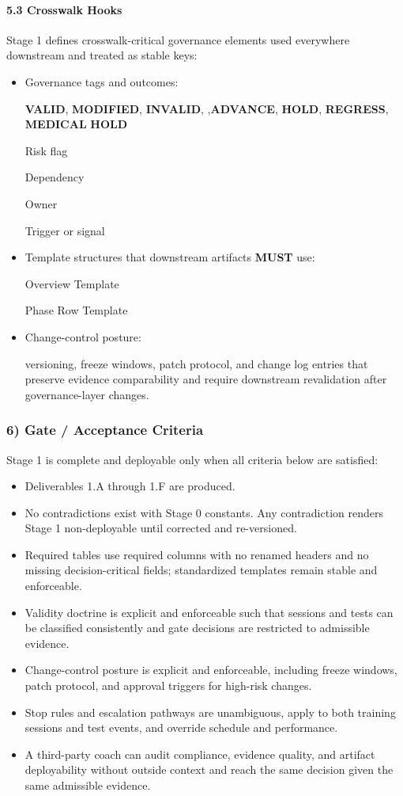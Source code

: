\documentclass[10pt]{article}
\begin{document}
\paragraph*{5.3 Crosswalk Hooks}

Stage 1 defines crosswalk-critical governance elements used everywhere downstream and treated as stable keys:

\begin{itemize}
\item Governance tags and outcomes:

\textbf{VALID}, \textbf{MODIFIED}, \textbf{INVALID}, ,\textbf{ADVANCE}, \textbf{HOLD}, \textbf{REGRESS}, \textbf{MEDICAL} \textbf{HOLD}

Risk flag

Dependency

Owner

Trigger or signal

\item Template structures that downstream artifacts \textbf{MUST} use:

Overview Template

Phase Row Template

\item Change-control posture:

versioning, freeze windows, patch protocol, and change log entries that preserve evidence comparability and require downstream revalidation after governance-layer changes.
\end{itemize}

\subsubsection*{6) Gate / Acceptance Criteria}

Stage 1 is complete and deployable only when all criteria below are satisfied:

\begin{itemize}
\item Deliverables 1.A through 1.F are produced.
\item No contradictions exist with Stage 0 constants. Any contradiction renders Stage 1 non-deployable until corrected and re-versioned.
\item Required tables use required columns with no renamed headers and no missing decision-critical fields; standardized templates remain stable and enforceable.
\item Validity doctrine is explicit and enforceable such that sessions and tests can be classified consistently and gate decisions are restricted to admissible evidence.
\item Change-control posture is explicit and enforceable, including freeze windows, patch protocol, and approval triggers for high-risk changes.
\item Stop rules and escalation pathways are unambiguous, apply to both training sessions and test events, and override schedule and performance.
\item A third-party coach can audit compliance, evidence quality, and artifact deployability without outside context and reach the same decision given the same admissible evidence.
\end{itemize}
\end{document}
